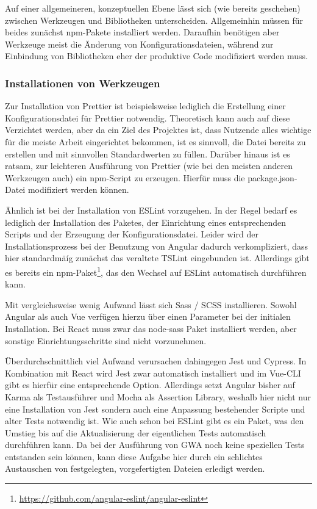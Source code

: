 Auf einer allgemeineren, konzeptuellen Ebene lässt sich (wie bereits geschehen) zwischen Werkzeugen und Bibliotheken unterscheiden. Allgemeinhin müssen für beides zunächst \gls{npm}-Pakete installiert werden. Daraufhin benötigen aber Werkzeuge meist die Änderung von Konfigurationsdateien, während zur Einbindung von Bibliotheken eher der produktive Code modifiziert werden muss.

\subsubsection{Installationen von Werkzeugen}
Zur Installation von Prettier ist beispielsweise lediglich die Erstellung einer Konfigurationsdatei für Prettier notwendig. Theoretisch kann auch auf diese Verzichtet werden, aber da ein Ziel des Projektes ist, dass Nutzende alles wichtige für die meiste Arbeit eingerichtet bekommen, ist es sinnvoll, die Datei bereits zu erstellen und mit sinnvollen Standardwerten zu füllen. Darüber hinaus ist es ratsam, zur leichteren Ausführung von Prettier (wie bei den meisten anderen Werkzeugen auch) ein \gls{npm}-Script zu erzeugen. Hierfür muss die package.json-Datei modifiziert werden können.

Ähnlich ist bei der Installation von ESLint vorzugehen. In der Regel bedarf es lediglich der Installation des Paketes, der Einrichtung eines entsprechenden Scripts und der Erzeugung der Konfigurationsdatei. Leider wird der Installationsprozess bei der Benutzung von Angular dadurch verkompliziert, dass hier standardmäíg zunächst das veraltete TSLint eingebunden ist. Allerdings gibt es bereits ein \gls{npm}-Paket\footnote{\url{https://github.com/angular-eslint/angular-eslint}}, das den Wechsel auf ESLint automatisch durchführen kann.

Mit vergleichsweise wenig Aufwand lässt sich Sass / SCSS installieren. Sowohl Angular als auch Vue verfügen hierzu über einen Parameter bei der initialen Installation. Bei React muss zwar das node-sass Paket installiert werden, aber sonstige Einrichtungsschritte sind nicht vorzunehmen.

Überdurchschnittlich viel Aufwand verursachen dahingegen Jest und Cypress. In Kombination mit React wird Jest zwar automatisch installiert und im Vue-\gls{CLI} gibt es hierfür eine entsprechende Option. Allerdings setzt Angular bisher auf Karma als Testausführer und Mocha als Assertion Library, weshalb hier nicht nur eine Installation von Jest sondern auch eine Anpassung bestehender Scripte und alter Tests notwendig ist. Wie auch schon bei ESLint gibt es ein Paket, was den Umstieg bis auf die Aktualisierung der eigentlichen Tests automatisch durchführen kann. Da bei der Ausführung von \gls{GWA} noch keine speziellen Tests entstanden sein können, kann diese Aufgabe hier durch ein schlichtes Austauschen von festgelegten, vorgefertigten Dateien erledigt werden.

